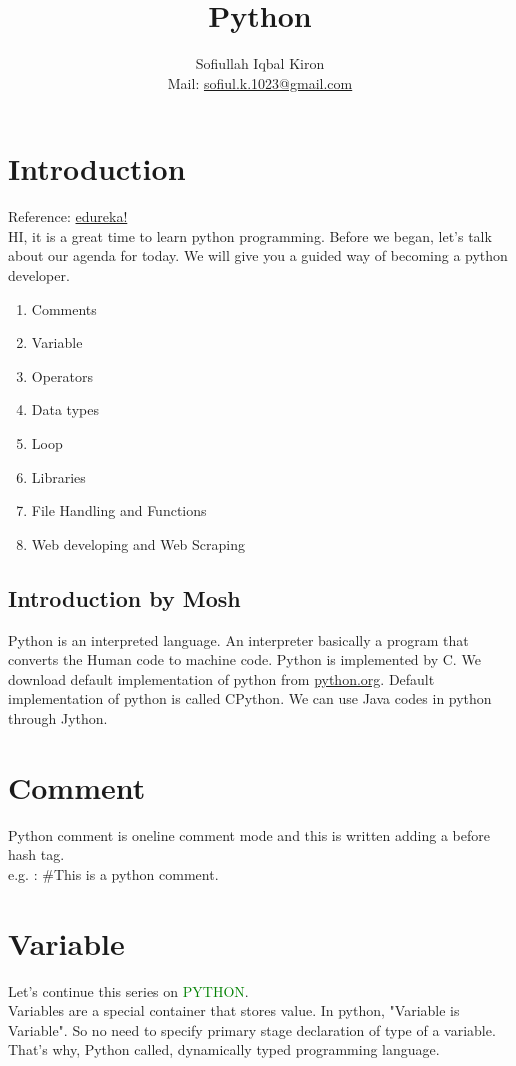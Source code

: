 \documentclass[11 pt, letterpaper]{report}
\title{Python}
\author
{
 Sofiullah Iqbal Kiron\\
 Mail: \href{mailto:sofiul.k.1023@gmail.com}{sofiul.k.1023@gmail.com}
}
\affil{BSMRSTU, Department of CSE}
\begin{document}
\maketitle
\tableofcontents

\section*{Introduction}
Reference: \href{https://www.youtube.com/watch?v=WGJJIrtnfpk&t=12362s}{edureka!}\\
HI, it is a great time to learn python programming. Before we began, let's talk about our agenda for today. We will give you a guided way of becoming a python developer.\\
\begin{enumerate}
 \item Comments
 \item Variable
 \item Operators
 \item Data types
 \item Loop
 \item Libraries
 \item File Handling and Functions
 \item Web developing and Web Scraping
\end{enumerate}

\subsection*{Introduction by Mosh}
Python is an interpreted language. An interpreter basically a program that converts the Human code to machine code. Python is implemented by C. We download default implementation of python from \href{python official website}{python.org}. Default implementation of python is called CPython. We can use Java codes in python through Jython.

\section*{Comment}
Python comment is oneline comment mode and this is written adding a before hash tag. \\
e.g. : \#This is a python comment.

\section*{Variable}
Let's continue this series on \textcolor{green}{PYTHON}. \\
Variables are a special container that stores value. In python, "Variable is Variable". So no need to specify primary stage declaration of type of a variable. That's why, Python called, dynamically typed programming language.
\end{document}
